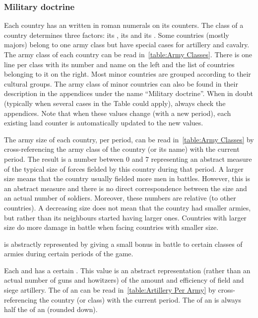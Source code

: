 \subsubsection{Military doctrine}
\aparag Each country has an  written in roman numerals on
its counters.
\bparag The class of a country determines three factors: its , its
 and its .
\bparag Some countries (mostly majors) belong to one army class but have
special cases for artillery and cavalry.
\bparag The army class of each country can be read in~\ref{table:Army
  Classes}. There is one line per class with its number and name on the left
and the list of countries belonging to it on the right.
\bparag Most minor countries are grouped according to their cultural groups.
\bparag The army class of minor countries can also be found in their
description in the appendices under the name ``Military doctrine''.
\bparag When in doubt (typically when several cases in the Table could apply),
always check the appendices.
\bparag Note that when these values change (with a new period), each existing
land counter is automatically updated to the new values.


\aparag[Size.] The army size of each country, per period, can be read
in~\ref{table:Army Classes} by cross-referencing the army class of the country
(or its name) with the current period.
\bparag The result is a number between 0 and 7 representing an abstract
measure of the typical size of forces fielded by this country during that
period.
\bparag A larger size means that the country usually fielded more men in
battles. However, this is an abstract measure and there is no direct
correspondence between the size and an actual number of soldiers. Moreover,
these numbers are relative (to other countries). A decreasing size does not
mean that the country had smaller armies, but rather than its neighbours
started having larger ones.
\bparag Countries with larger size do more damage in battle when facing
countries with smaller size.

\aparag[Cavalry] is abstractly represented by giving a small bonus in battle
to certain classes of armies during certain periods of the game.

 Each \ARMY\facemoins and \ARMY\faceplus has a
certain . This value is an abstract representation
(rather than an actual number of guns and howitzers) of the amount and
efficiency of field and siege artillery.
\bparag The  of an \ARMY\faceplus can be read
in~\ref{table:Artillery Per Army} by cross-referencing the country (or class)
with the current period.
\bparag The  of an \ARMY\facemoins is always half the
 of an \ARMY\faceplus (rounded down).


